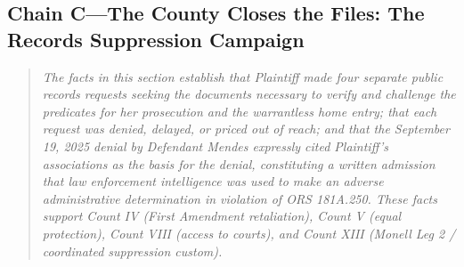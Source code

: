 \documentclass[12pt,letterpaper]{article}
\begin{document}
	\subsection*{Chain C---The County Closes the Files: The Records Suppression Campaign}
	\begin{quote}
		\textit{The facts in this section establish that Plaintiff made
			four separate public records requests seeking the documents
			necessary to verify and challenge the predicates for her
			prosecution and the warrantless home entry; that each request
			was denied, delayed, or priced out of reach; and that the
			September 19, 2025 denial by Defendant Mendes expressly cited
			Plaintiff's associations as the basis for the denial,
			constituting a written admission that law enforcement
			intelligence was used to make an adverse administrative
			determination in violation of ORS 181A.250. These facts support
			Count IV (First Amendment retaliation), Count V (equal
			protection), Count VIII (access to courts), and Count XIII
			(Monell Leg 2 / coordinated suppression custom).}
	\end{quote}
\end{document}
